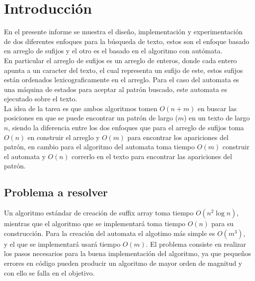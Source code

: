 \documentclass[letterpaper,10pt]{article}
\begin{document}
	\newpage

	\section{Introducción}

	En el presente informe se muestra el diseño, implementación y experimentación de dos diferentes enfoques para la búsqueda de texto, estos son el enfoque basado en arreglo de sufijos y el otro es el basado en el algoritmo con autómata.\\

	En particular el arreglo de sufijos es un arreglo de enteros, donde cada entero apunta a un caracter del texto, el cual representa un sufijo de este, estos sufijos están ordenados lexicograficamente en el arreglo. Para el caso del automata es una máquina de estados para aceptar al patrón buscado, este automata es ejecutado sobre el texto.\\

	La idea de la tarea es que ambos algoritmos tomen $O(n +m)$ en buscar las posiciones en que se puede encontrar un patrón de largo ($m$) en un texto de largo $n$, siendo la diferencia entre los dos enfoques que para el arreglo de sufijos toma $O(n)$ en construir el arreglo y $O(m)$  para encontrar los apariciones del patrón, en cambio para el algoritmo del automata toma tiempo $O(m)$ construir el automata y $O(n)$ correrlo en el texto para encontrar las apariciones del patrón.
	
	\subsection{Problema a resolver}

	Un algoritmo estándar de creación de suffix array toma tiempo $O(n^2 \log n)$, mientras que el algoritmo que se implementará toma tiempo $O(n)$ para su construcción.
	Para la creación del automata el algotimo más simple es $O(m^3)$, y el que se implementará usará tiempo $O(m)$.
	El problema consiste en realizar los pasos necesarios para la buena implementación del algoritmo, ya que pequeños errores en código pueden producir un algoritmo de mayor orden de magnitud
	y con ello se falla en el objetivo.
\end{document}

